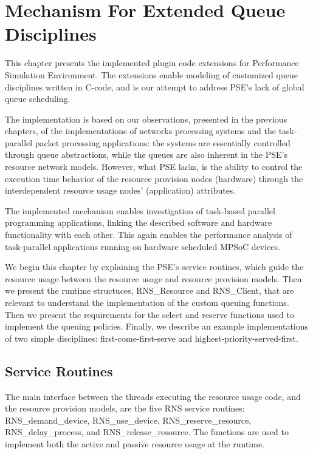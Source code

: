 \chapter{Mechanism For Extended Queue Disciplines}
\label{chapter:mechanism-for-extended-queue-disciplines}

This chapter presents the implemented plugin code extensions for Performance Simulation Environment. The extensions enable modeling of customized queue disciplines written in C-code, and is our attempt to address PSE's lack of global queue scheduling.

The implementation is based on our observations, presented in the previous chapters, of the implementations of networks processing systems and the task-parallel packet processing applications: the systems are essentially controlled through queue abstractions, while the queues are also inherent in the PSE's resource network models. However, what PSE lacks, is the ability to control the execution time behavior of the resource provision nodes (hardware) through the interdependent resource usage nodes' (application) attributes.

The implemented mechanism enables investigation of task-based parallel programming applications, linking the described software and hardware functionality with each other. This again enables the performance analysis of task-parallel applications running on hardware scheduled MPSoC devices.

We begin this chapter by explaining the PSE's service routines, which guide the resource usage between the resource usage and resource provision models. Then we present the runtime structuces, RNS\_Resource and RNS\_Client, that are relevant to understand the implementation of the custom queuing functions. Then we present the requirements for the select and reserve functions used to implement the queuing policies. Finally, we describe an example implementations of two simple disciplines: first-come-first-serve and highest-priority-served-first.

\section{Service Routines}
The main interface between the threads executing the resource usage code, and the resource provision models, are the five RNS service routines: RNS\_demand\_device, RNS\_use\_device, RNS\_reserve\_resource, RNS\_delay\_process, and RNS\_release\_resource. The functions are used to implement both the active and passive resource usage at the runtime.

